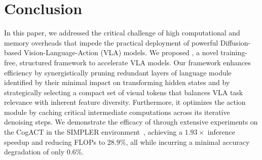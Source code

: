 \section{Conclusion}
\label{sec:con}
In this paper, we addressed the critical challenge of high computational and memory overheads that impede the practical deployment of powerful Diffusion-based Vision-Language-Action (VLA) models. We proposed \mymethod{}, a novel training-free, structured framework to accelerate VLA models. Our framework enhances efficiency by synergistically pruning redundant layers of language module identified by their minimal impact on transforming hidden states and by strategically selecting a compact set of visual tokens that balances VLA task relevance with inherent feature diversity. Furthermore, it optimizes the action module by caching critical intermediate computations across its iterative denoising steps. We demonstrate the efficacy of \mymethod{} through extensive experiments on the CogACT in the SIMPLER environment~\citep{li2024evaluating}, achieving a $1.93\times$ inference speedup and reducing FLOPs to $28.9\%$, all while incurring a minimal accuracy degradation of only $0.6\%$. 
